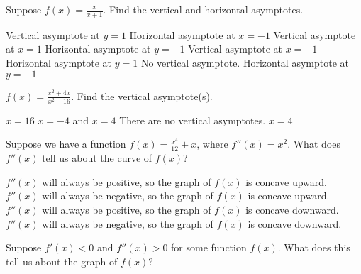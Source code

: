 \documentclass[addpoints, 12pt]{exam}%
\newcommand{\spc}{\vspace*{0.5cm}}
\begin{document}
\begin{questions}
\question[1]

Suppose $f(x) = \frac{x}{x+1}$. Find the vertical and horizontal asymptotes.

\begin{multicols}{2}
\begin{choices}
\choice Vertical asymptote at $y = 1$
\newline Horizontal asymptote at $x = -1$
\choice Vertical asymptote at $x = 1$
\newline Horizontal asymptote at $y = -1$
\CorrectChoice Vertical asymptote at $x = -1$
\newline Horizontal asymptote at $y = 1$
\choice No vertical asymptote.
\newline Horizontal asymptote at $y = -1$
\end{choices}
\end{multicols}

\spc

\question[1]

$f(x) = \frac{x^2 + 4x}{x^2-16}$. Find the vertical asymptote(s).

\begin{multicols}{2}
\begin{choices}
\choice $x = 16$
\choice $x = -4$ and $x = 4$
\choice There are no vertical asymptotes. 
\CorrectChoice $x = 4$
\end{choices}
\end{multicols}

\newpage

\question[1]

Suppose we have a function $f(x) = \frac{x^4}{12} + x$, where $f''(x) = x^2$. What does $f''(x)$ tell us about the curve of $f(x)$?

\begin{multicols}{2}
\begin{choices}
\CorrectChoice $f''(x)$ will always be positive, so the graph of $f(x)$ is concave upward.
\choice $f''(x)$ will always be negative, so the graph of $f(x)$ is concave upward.
\choice $f''(x)$ will always be positive, so the graph of $f(x)$ is concave downward.
\choice $f''(x)$ will always be negative, so the graph of $f(x)$ is concave downward.
\end{choices}
\end{multicols}

\spc

\question[1]

Suppose $f'(x) < 0$ and $f''(x) > 0$ for some function $f(x)$. What does this tell us about the graph of $f(x)$?



\end{questions}
\end{document}
